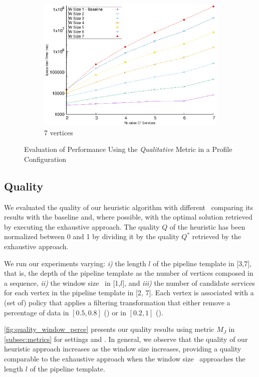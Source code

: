\begin{figure}[!t]
\begin{subfigure}{0.45\textwidth}
        \includegraphics[width=\textwidth]{Images/graphs/window_time_performance_qualitative_n7_s7_50_80_n7}
        \caption{7 vertices}
        \label{fig:time_window_perce_wide_7n}
      \end{subfigure}
      \caption{{\color{OurColor2}Evaluation of Performance Using the \emph{Qualitative} Metric in a \average Profile Configuration}}
      \label{fig:time_window_perce_average}
    \end{figure}

    \subsection{Quality}\label{subsec:experiments_quality}
    We evaluated the quality of our heuristic algorithm with different \windowsize\ comparing its results with the baseline and, where possible, with the optimal solution retrieved by executing the exhaustive approach.
    The quality $Q$ of the heuristic has been normalized between 0 and 1 by dividing it by the quality $Q^*$ retrieved by the exhaustive approach.

    We run our experiments varying: \emph{i)} the length $l$ of the pipeline template in [3,7], that is, the depth of the pipeline template as the number of vertices composed in a sequence, \emph{ii)} the window size \windowsize\ in [1,$l$], and \emph{iii)} the number of candidate services for each vertex in the pipeline template in [2, 7]. Each vertex is associated with a (set of) policy that applies a filtering transformation that either remove a percentage of data in $[0.5,0.8]$ (\average) or in $[0.2,1]$ (\wide).

      {\color{OurColor2}\cref{fig:quality_window_perce} presents}  our quality results using metric $M_J$ in \cref{subsec:metrics} for settings \wide and \average.
    In general, we observe that the quality of our heuristic approach increases as the window size increases, providing a quality comparable to the exhaustive approach when the window size \windowsize\ approaches the length $l$ of the pipeline template.

